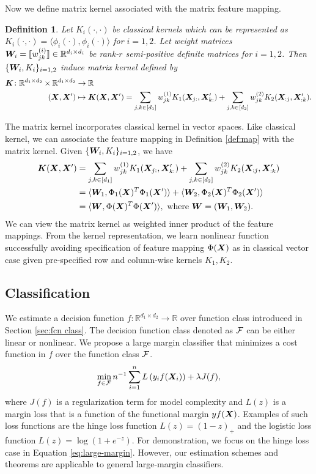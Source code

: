 \documentclass[12pt]{article}
\newtheorem{defn}{Definition}
\begin{document}
Now we define matrix kernel associated with the matrix feature mapping.
\begin{defn}\label{def:kernel}
Let $K_i(\cdot,\cdot)$ be classical kernels which can be represented as $K_i(\cdot,\cdot) = \langle \phi_i(\cdot),\phi_i(\cdot)\rangle$ for $i=1,2$. Let weight matrices $\bm{W}_i = \llbracket w^{(i)}_{jk} \rrbracket\in\mathbb{R}^{d_i\times d_i}$ be  rank-$r$ semi-positive definite matrices for $i = 1,2$. Then $\{\bm{W}_i,K_i\}_{i=1,2}$  induce matrix kernel defined by
\begin{align}
    \bm K\colon\mathbb{R}^{d_1\times d_2}\times \mathbb{R}^{d_1\times d_2}&\rightarrow \mathbb{R}\\
    (\bm X,\bm X')&\mapsto \bm K(\bm X,\bm X')  = \sum_{j,k\in[d_1]}w^{(1)}_{jk}K_1(\bm X_{j:},\bm X'_{k:})+\sum_{j,k\in[d_2]}w^{(2)}_{jk}K_2(\bm X_{:j},\bm X'_{:k}).
\end{align}
\end{defn}
The matrix kernel incorporates classical kernel in vector spaces. Like classical kernel, we can associate the feature mapping in Definition \ref{def:map} with the matrix kernel. Given $\{\bm{W}_i,K_i\}_{i=1,2}$, we have
\begin{align}\bm K(\bm X,\bm X')& = \sum_{j,k\in[d_1]}w^{(1)}_{jk}K_1(\bm X_{j:},\bm X'_{k:})+\sum_{j,k\in[d_2]}w^{(2)}_{jk}K_2(\bm X_{:j},\bm X'_{:k}) \\
&=\langle \bm{W}_1,\Phi_1(\bm X)^T\Phi_1(\bm X') \rangle + \langle \bm{W}_2,\Phi_2(\bm X)^T\Phi_2(\bm X')\rangle\\
&= \langle \bm{W},\Phi(\bm X)^T\Phi(\bm X')\rangle, \text{ where } \bm{W} = (\bm{W}_1,\bm{W}_2).
\end{align}
We can view the matrix kernel as weighted inner product of the feature mappings. From the kernel representation, we learn nonlinear function successfully  avoiding specification of feature mapping $\Phi(\bm X)$ as in classical vector case given pre-specified row and column-wise kernels $K_1,K_2$. 

\subsection{Classification}
\label{subsec:pb1}
We estimate a decision function $f\colon\mathbb{R}^{d_1\times d_2}\rightarrow \mathbb{R}$ over function class introduced in Section \ref{sec:fcn class}. The decision function class denoted as $\mathcal{F}$ can be either linear or nonlinear. 
We propose a large margin classifier that minimizes a cost function in $f$ over the function class $\mathcal{F}$.
\begin{align}
\label{eq:large-margin}
\min_{f\in\mathcal{F}}n^{-1}\sum_{i=1}^n L\left(y_i f(\bm X_i)\right)+\lambda J(f),
\end{align}
where $J(f)$ is a regularization term for model complexity and $L(z)$ is a margin loss that is a function of the functional margin $yf(\bm X)$. Examples of such loss functions are the hinge loss function $L(z) = (1-z)_+$ and the logistic loss function $L(z) =\log(1+e^{-z})$.  For demonstration, we focus on the hinge loss case in Equation \eqref{eq:large-margin}. However, our estimation schemes and theorems are applicable to general large-margin classifiers.
\end{document}
